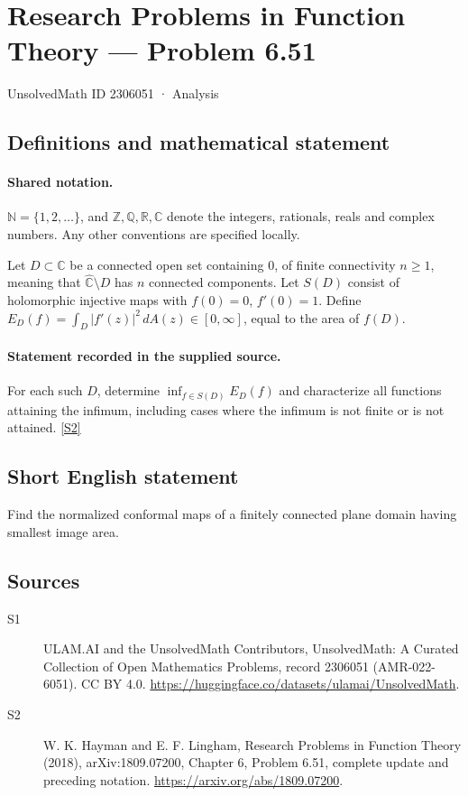 \documentclass[11pt]{article}
\newcommand{\sref}[2]{\hyperlink{source:#1:#2}{[S#2]}}
\begin{document}
\setcounter{section}{2306050}
\section{Research Problems in Function Theory — Problem 6.51}\label{2306051}
{\small\sffamily UnsolvedMath ID 2306051 · Analysis}
\subsection{Definitions and mathematical statement}

\paragraph{Shared notation.}$\mathbb N=\{1,2,\ldots\}$, and $\mathbb Z,\mathbb Q,\mathbb R,\mathbb C$ denote the integers, rationals, reals and complex numbers. Any other conventions are specified locally.


Let $D\subset\mathbb C$ be a connected open set containing $0$, of finite connectivity $n\ge1$, meaning that $\widehat{\mathbb C}\setminus D$ has $n$ connected components. Let $S(D)$ consist of holomorphic injective maps with $f(0)=0$, $f'(0)=1$. Define $E_D(f)=\int_D|f'(z)|^2\,dA(z)\in[0,\infty]$, equal to the area of $f(D)$.
\paragraph{Statement recorded in the supplied source.}
For each such $D$, determine $\inf_{f\in S(D)}E_D(f)$ and characterize all functions attaining the infimum, including cases where the infimum is not finite or is not attained. \sref{2306051}{2}
\subsection{Short English statement}
Find the normalized conformal maps of a finitely connected plane domain having smallest image area.
\subsection{Sources}
\begin{description}
\item[\hypertarget{source:2306051:1}{S1}] ULAM.AI and the UnsolvedMath Contributors, UnsolvedMath: A Curated Collection of Open Mathematics Problems, record 2306051 (AMR-022-6051). CC BY 4.0. \url{https://huggingface.co/datasets/ulamai/UnsolvedMath}.
\item[\hypertarget{source:2306051:2}{S2}] W. K. Hayman and E. F. Lingham, Research Problems in Function Theory (2018), arXiv:1809.07200, Chapter 6, Problem 6.51, complete update and preceding notation. \url{https://arxiv.org/abs/1809.07200}.
\end{description}
\label{end:2306051}
\end{document}
